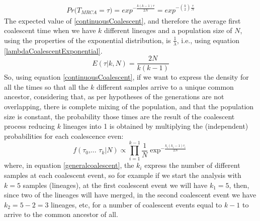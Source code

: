 \documentclass[12pt,mythesisstyle]{report}
\begin{document}
\begin{equation}\label{continuousCoalescent}
\begin{split}
Pr\big(T_{MRCA}=\tau \big)=exp^{-\frac{k(k-1)\tau}{2N}}=exp^{-\binom{k}{2}\frac{\tau}{N}}
\end{split}
\end{equation}
The expected value of \eqref{continuousCoalescent}, and therefore the average first coalescent time when we have $k$ different lineages and a population size of $N$, using the properties of the exponential distribution, is $\frac{1}{\lambda}$, i.e., using equation \eqref{lambdaCoalescentExponential}.
\begin{equation}\label{expectedSingleCoalescent}
E(\tau|k, N)=\frac{2N}{k(k-1)}
\end{equation}
 So, using equation \eqref{continuousCoalescent}, if we want to express the density for all the times so that all the $k$ different samples arrive to a unique common ancestor, considering that, as per hypotheses of the generations are not overlapping, there is complete mixing of the population, and that the population size is constant, the probability those times are the result of the coalescent process reducing $k$ lineages into 1 is obtained by multiplying the (independent) probabilities for each coalescence even:
\begin{equation}\label{generalcoalescent}
f(\tau_0 \text{,... }\tau_k|N)\propto\prod_{i=1}^{k-1}\frac{1}{N}\exp^{-\frac{k_i(k_i-1)\tau_i}{2N}}
\end{equation}
where, in equation \eqref{generalcoalescent}, the $k_i$ express the number of different samples at each coalescent event, so for example if we start the analysis with $k=5$ samples (lineages), at the first coalescent event we will have $k_1=5$, then, since two of the lineages will have merged, in the second coalescent event we have $k_2=5-2=3$ lineages, etc, for a number of coalescent events equal to $k-1$ to arrive to the common ancestor of all.
\end{document}

